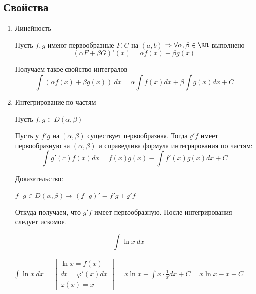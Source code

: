 \newpage

\subsection{Свойства}

\begin{enumerate}
    \item
        Линейность

        Пусть \( f, g \) имеют первообразные \( F, G \) на \( (a, b) \) 
        \( \Rightarrow \forall \alpha, \beta \in \RR \)
        выполнено
        \[
            (\alpha F + \beta G)' (x) = \alpha f(x) + \beta g(x)
        \]

        Получаем такое свойство интегралов:
        \[
            \int (\alpha f(x) + \beta g(x)) \: dx = \alpha \int f(x) dx + \beta \int g(x) dx + C
        \]
    \item
        Интегрирование по частям

        Пусть \( f, g \in D(\alpha, \beta) \)

        Пусть у \( f'g \) на \( (\alpha, \beta) \) существует первообразная.
        Тогда \( g'f \) имеет первообразную на \( (\alpha, \beta) \) и справедлива формула
        интегрирования по частям:
        \[
            \int g'(x) f(x) dx = f(x) g(x) - \int f'(x) g(x) dx + C
        \]

        Доказательство:

        \(f \cdot g \in D(\alpha, \beta) \Rightarrow (f \cdot g)' = f' g + g' f \)

        Откуда получаем, что \( g'f \) имеет первообразную. После интегрирования следует искомое.
\end{enumerate}

\begin{example}{}{}
    \[
        \int \ln x \: dx
    \]
\end{example}

\begin{gather*}
    \int \ln x \: dx
        = \left[
            \begin{gathered}
                \ln x = f(x)
                \\
                dx = \varphi' (x) dx
                \\
                \varphi (x) = x
            \end{gathered}
        \right] =
    x \ln x - \int x \cdot \frac{1}{x} dx + C = x \ln x - x + C
\end{gather*}

